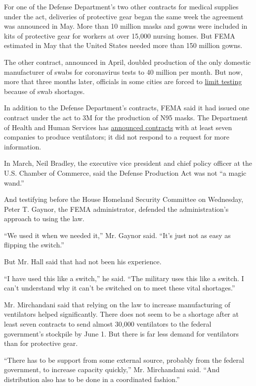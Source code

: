 For one of the Defense Department's two other contracts for medical
supplies under the act, deliveries of protective gear began the same
week the agreement was announced in May. More than 10 million masks and
gowns were included in kits of protective gear for workers at over
15,000 nursing homes. But FEMA estimated in May that the United States
needed more than 150 million gowns.

The other contract, announced in April, doubled production of the only
domestic manufacturer of swabs for coronavirus tests to 40 million per
month. But now, more that three months later, officials in some cities
are forced to
\href{https://www.nytimes3xbfgragh.onion/2020/07/06/us/coronavirus-test-shortage.html}{limit
testing} because of swab shortages.

In addition to the Defense Department's contracts, FEMA said it had
issued one contract under the act to 3M for the production of N95 masks.
The Department of Health and Human Services has
\href{https://www.hhs.gov/about/news/2020/04/13/hhs-announces-new-ventilator-contracts-orders-now-totaling-over-130000-ventilators.html}{announced
contracts} with at least seven companies to produce ventilators; it did
not respond to a request for more information.

In March, Neil Bradley, the executive vice president and chief policy
officer at the U.S. Chamber of Commerce, said the Defense Production Act
was not ``a magic wand.''

And testifying before the House Homeland Security Committee on
Wednesday, Peter T. Gaynor, the FEMA administrator, defended the
administration's approach to using the law.

``We used it when we needed it,'' Mr. Gaynor said. ``It's just not as
easy as flipping the switch.''

But Mr. Hall said that had not been his experience.

``I have used this like a switch,'' he said. ``The military uses this
like a switch. I can't understand why it can't be switched on to meet
these vital shortages.''

Mr. Mirchandani said that relying on the law to increase manufacturing
of ventilators helped significantly. There does not seem to be a
shortage after at least seven contracts to send almost 30,000
ventilators to the federal government's stockpile by June 1. But there
is far less demand for ventilators than for protective gear.

``There has to be support from some external source, probably from the
federal government, to increase capacity quickly,'' Mr. Mirchandani
said. ``And distribution also has to be done in a coordinated fashion.''

